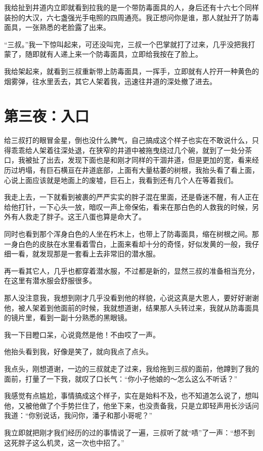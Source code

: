 我给扯到井道内立即就看到拉我的是一个带防毒面具的人，身后还有十六七个同样装扮的大汉，六七盏强光手电照的四周通亮。我正想问你是谁，那人就扯开了防毒面具，一张熟悉的老脸露了出来。

“三叔。”我一下惊叫起来，可还没叫完，三叔一个巴掌就打了过来，几乎没把我打蒙了，随即就有人递上来一个防毒面具，立即给我按在了脸上。

我给架起来，就看到三叔重新带上防毒面具，一挥手，立即就有人拧开一种黄色的烟雾弹，往水里丢去，其它人架着我，迅速往井道的深处撤了进去。

\chapter{第三夜：入口}

给三叔打的眼冒金星，倒也没什么脾气，自己搞成这个样子也实在不敢说什么，只得乖乖给人架着往深处退，在狭窄的井道中被拖曳绕过几个碗，就到了一处分茶口，我被扯了出去，发现下面也是和刚才同样的干涸井道，但是更加的宽，看来经历过坍塌，有巨石横亘在井道底部，上面有大量枯萎的树根，我抬头看了看上面，心说上面应该就是地面上的废墟，巨石上，我看到还有几个人在等着我们。

我走上去，一下就看到被裹的严严实实的胖子混在里面，还是昏迷不醒，有人正在给他打针，一下心头一放，暗叹一声上帝保佑，看来在那白色的人救我的时候，另外有人救走了胖子。这王八蛋也算是命大了。

同时也看到那个浑身白色的人坐在朽木上，也带上了防毒面具，缩在树根之间。那一身白色的皮肤在水里看着雪白，上面来看却十分的奇怪，好似发黄的一般，我仔细一看，就发现那是一套看上去非常旧的潜水服。

再一看其它人，几乎也都穿着潜水服，不过都是新的，显然三叔的准备相当充分，在这里有潜水服会舒服很多。

那人没注意我，我想到刚才几乎没看到他的样貌，心说这真是大恩人，要好好谢谢他，被人架着到他面前的时候，我就想道谢，结果那人头转过来，我就从防毒面具的镜片里，看到一副十分熟悉的黑眼镜。

我一下目瞪口呆，心说竟然是他！不由哎了一声。

他抬头看到我，好像是笑了，就向我点了点头。

我点头，刚想道谢，一边的三叔就走了过来，我给拖到三叔的面前，他蹲到了我的面前，打量了一下我，就叹了口长气：“你小子他娘的～怎么这么不听话？”

我感觉有点尴尬，事情搞成这个样子，实在是始料不及，也不知道怎么说了，想叫他，又被他做了个手势拦住了，他坐下来，也没责备我，只是立即轻声用长沙话问我道：“你别说话，我问你，潘子和那小哥呢？”

我立即就把刚才我们经历的过的事情说了一遍，三叔听了就“啧”了一声：“想不到这死胖子这么机灵，这一次也中招了。”

